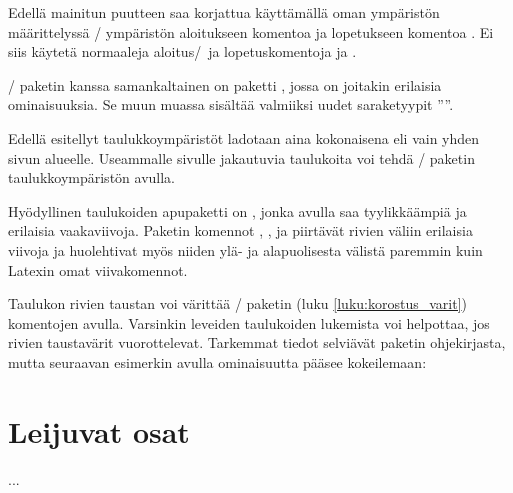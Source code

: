 Edellä mainitun puutteen saa korjattua käyttämällä oman ympäristön
määrittelyssä \-/ ympäristön aloitukseen komentoa
 ja lopetukseen komentoa . Ei
siis käytetä normaaleja aloitus\-/\ ja lopetuskomentoja 
ja .

\begin{koodilohkosis}
\newenvironment{omataulukko}[1]
{\tabularx{\linewidth}{#1}}
{\endtabularx}
\end{koodilohkosis}

\-/ paketin kanssa samankaltainen on paketti
, jossa on joitakin erilaisia
ominaisuuksia. Se muun muassa sisältää valmiiksi uudet saraketyypit
''''.

Edellä esitellyt taulukkoympäristöt ladotaan aina kokonaisena eli vain
yhden sivun alueelle. Useammalle sivulle jakautuvia taulukoita voi tehdä
\-/ paketin taulukkoympäristön
 avulla.

Hyödyllinen taulukoiden apupaketti on
, jonka avulla saa tyylikkäämpiä ja
erilaisia vaakaviivoja. Paketin komennot ,
,  ja  piirtävät
rivien väliin erilaisia viivoja ja huolehtivat myös niiden ylä- ja
alapuolisesta välistä paremmin kuin Latexin omat viivakomennot.

Taulukon rivien taustan voi värittää \-/
paketin (luku \ref{luku:korostus_varit}) komentojen
avulla. Varsinkin leveiden taulukoiden lukemista voi helpottaa, jos
rivien taustavärit vuorottelevat. Tarkemmat tiedot selviävät paketin
ohjekirjasta, mutta seuraavan esimerkin avulla ominaisuutta pääsee
kokeilemaan:

\begin{koodilohkosis}
\usepackage[table]{xcolor}     %
\end{koodilohkosis}

\section{Leijuvat osat}
\label{luku:leijuosat}

...


